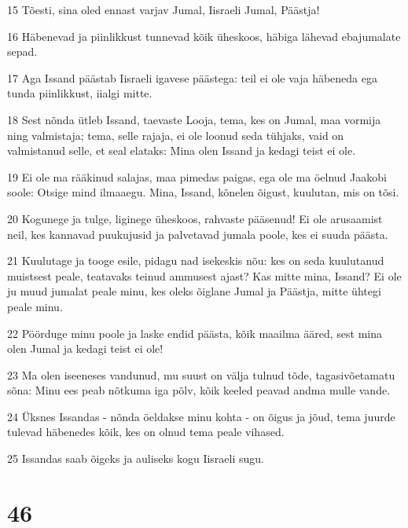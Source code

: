 \par 15 Tõesti, sina oled ennast varjav Jumal, Iisraeli Jumal, Päästja!
\par 16 Häbenevad ja piinlikkust tunnevad kõik üheskoos, häbiga lähevad ebajumalate sepad.
\par 17 Aga Issand päästab Iisraeli igavese päästega: teil ei ole vaja häbeneda ega tunda piinlikkust, iialgi mitte.
\par 18 Sest nõnda ütleb Issand, taevaste Looja, tema, kes on Jumal, maa vormija ning valmistaja; tema, selle rajaja, ei ole loonud seda tühjaks, vaid on valmistanud selle, et seal elataks: Mina olen Issand ja kedagi teist ei ole.
\par 19 Ei ole ma rääkinud salajas, maa pimedas paigas, ega ole ma öelnud Jaakobi soole: Otsige mind ilmaaegu. Mina, Issand, kõnelen õigust, kuulutan, mis on tõsi.
\par 20 Kogunege ja tulge, liginege üheskoos, rahvaste pääsenud! Ei ole arusaamist neil, kes kannavad puukujusid ja palvetavad jumala poole, kes ei suuda päästa.
\par 21 Kuulutage ja tooge esile, pidagu nad isekeskis nõu: kes on seda kuulutanud muistsest peale, teatavaks teinud ammusest ajast? Kas mitte mina, Issand? Ei ole ju muud jumalat peale minu, kes oleks õiglane Jumal ja Päästja, mitte ühtegi peale minu.
\par 22 Pöörduge minu poole ja laske endid päästa, kõik maailma ääred, sest mina olen Jumal ja kedagi teist ei ole!
\par 23 Ma olen iseeneses vandunud, mu suust on välja tulnud tõde, tagasivõetamatu sõna: Minu ees peab nõtkuma iga põlv, kõik keeled peavad andma mulle vande.
\par 24 Üksnes Issandas - nõnda öeldakse minu kohta - on õigus ja jõud, tema juurde tulevad häbenedes kõik, kes on olnud tema peale vihased.
\par 25 Issandas saab õigeks ja auliseks kogu Iisraeli sugu.

\chapter{46}

